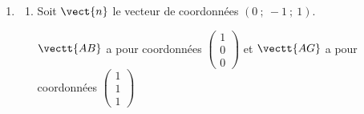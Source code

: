 \begin{enumerate}
\begin{enumerate}
$\aligned[t]
\left\{
\begin{array}{l !{=} l }
k & \dfrac{1}{2}+\dfrac{1}{2} t \\[5pt]
\dfrac{1}{2}k & t \\[5pt]
\dfrac{1}{2}k & t
\end{array}
\right.
&
\iff
\left\{
\begin{array}{l !{=} l }
k & \dfrac{1}{2}+\dfrac{1}{2} t \\[5pt]
k & 2 t
\end{array} 
\right.
\iff
\left\{
\begin{array}{l !{=} l }
2t & \dfrac{1}{2}+\dfrac{1}{2} t \\[5pt]
k & 2 t
\end{array} 
\right.
\iff
\left\{
\begin{array}{l !{=} l }
\dfrac{3}{2} t & \dfrac{1}{2} \\[5pt]
k & 2 t
\end{array}
\right.\\
&
\iff
\left\{
\begin{array}{l !{=} l }
 t & \dfrac{1}{3} \\[5pt]
k & \dfrac{2}{3}
\end{array}
\right.
\endaligned$

Donc les droites (AJ) et (IG) sont sécantes.
Pour $k=\dfrac{2}{3}$, on a
$\left \{
\begin{array}{l !{=} l }
k & \dfrac{2}{3} \\[5pt]
\dfrac{1}{2}k &  \dfrac{1}{3} \\[5pt]
\dfrac{1}{2}k &  \dfrac{1}{3}
\end{array} 
\right.$

Le point S d'intersection des droites (AJ) et (IG) a donc pour coordonnées
$\left (\dfrac{2}{3}\;,\; \dfrac{1}{3} \;,\; \dfrac{1}{3}\right )$.
		\end{enumerate}

		\item \begin{enumerate}
			\item %
Soit $\vect{n}$ le vecteur de coordonnées $(0 ~;~-1 ~;~ 1)$.

$\vectt{AB}$ a pour coordonnées 
$\begin{pmatrix}
1\\ 0 \\ 0
\end{pmatrix}$
et $\vectt{AG}$ a pour coordonnées
$\begin{pmatrix}
1\\ 1\\1
\end{pmatrix}$


\end{enumerate}
\end{enumerate}
